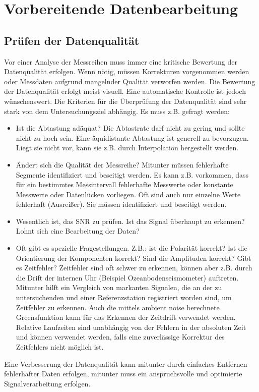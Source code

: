 \chapter{Vorbereitende Datenbearbeitung}

\section{Prüfen der Datenqualität}
Vor einer Analyse der Messreihen muss immer eine kritische Bewertung der Datenqualität erfolgen. Wenn nötig, müssen Korrekturen vorgenommen werden oder Messdaten aufgrund mangelnder Qualität verworfen werden. Die Bewertung der Datenqualität erfolgt meist visuell. Eine automatische Kontrolle ist jedoch wünschenswert. Die Kriterien für die Überprüfung der Datenqualität sind sehr stark von dem Untersuchungsziel abhängig. Es muss z.B. gefragt werden:
\begin{itemize}
\item
Ist die Abtastung adäquat? Die Abtastrate darf nicht zu gering und sollte nicht zu hoch sein. Eine äquidistante Abtastung ist generell zu bevorzugen. Liegt sie nicht vor, kann sie z.B. durch Interpolation hergestellt werden.
\item
Ändert sich die Qualität der Messreihe? Mitunter müssen fehlerhafte Segmente identifiziert und beseitigt werden. Es kann z.B. vorkommen, dass für ein bestimmtes Messintervall fehlerhafte Messwerte oder konstante Messwerte oder Datenlücken vorliegen. Oft sind auch nur einzelne Werte fehlerhaft (Ausreißer). Sie müssen identifiziert und beseitigt werden.
\item
Wesentlich ist, das SNR zu prüfen. Ist das Signal überhaupt zu erkennen? Lohnt sich eine Bearbeitung der Daten?
\item
Oft gibt es spezielle Fragestellungen. Z.B.: ist die Polarität korrekt? Ist die Orientierung der Komponenten korrekt? Sind die Amplituden korrekt? Gibt es Zeitfehler? Zeitfehler sind oft schwer zu erkennen, können aber z.B. durch die Drift der internen Uhr (Beispiel Ozeanbodenseismometer) auftreten. Mitunter hilft ein Vergleich von markanten Signalen, die an der zu untersuchenden und einer Referenzstation registriert worden sind, um Zeitfehler zu erkennen. Auch die mittels ambient noise berechnete Greensfunktion kann für das Erkennen der Zeitdrift verwendet werden. Relative Laufzeiten sind unabhängig von der Fehlern in der absoluten Zeit und können verwendet werden, falls eine zuverlässige Korrektur des Zeitfehlers nicht möglich ist.    
\end{itemize}
Eine Verbesserung der Datenqualität kann mitunter durch einfaches Entfernen fehlerhafter Daten erfolgen, mitunter muss ein anspruchsvolle und optimierte Signalverarbeitung erfolgen. 

